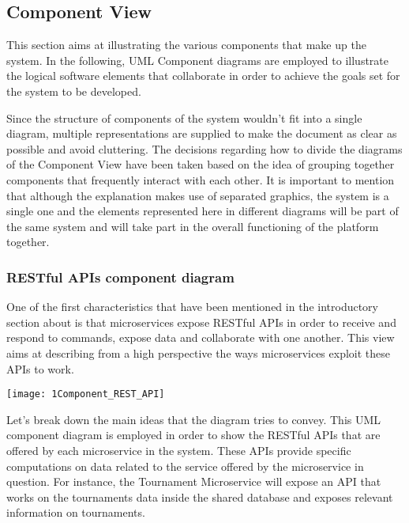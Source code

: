 \subsection{Component View}
This section aims at illustrating the various components that make up the \app system. In the following, UML Component diagrams are employed to illustrate the logical software elements that collaborate in order to achieve the goals set for the system to be developed.

Since the structure of components of the \app system wouldn't fit into a single diagram, multiple representations are supplied to make the document as clear as possible and avoid cluttering. 
The decisions regarding how to divide the diagrams of the Component View have been taken based on the idea of grouping together components that frequently interact with each other. 
It is important to mention that although the explanation makes use of separated graphics, the system is a single one and the elements represented here in different diagrams will be part of the same system and will take part in the overall functioning of the platform together.

\subsubsection{RESTful APIs component diagram}
\begin{minipage}{\linewidth}
One of the first characteristics that have been mentioned in the introductory section about \app is that microservices expose RESTful APIs in order to receive and respond to commands, expose data and collaborate with one another. This view aims at describing from a high perspective the ways microservices exploit these APIs to work.

\vspace*{1.5cm}
\texttt{[image: 1Component\_REST\_API]}

\end{minipage}

Let's break down the main ideas that the diagram tries to convey.
This UML component diagram is employed in order to show the RESTful APIs that are offered by each microservice in the system. These APIs provide specific computations on data related to the service offered by the microservice in question. For instance, the Tournament Microservice will expose an API that works on the tournaments data inside the shared database and exposes relevant information on tournaments.

